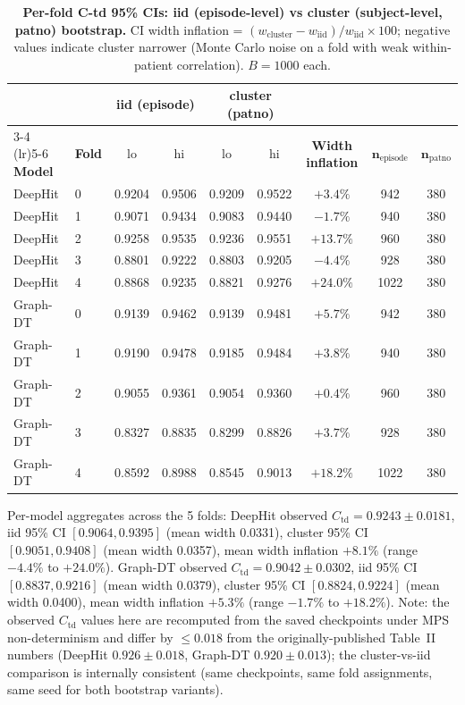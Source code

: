 \documentclass[11pt]{article}
\begin{document}
\begin{table}[h!]
\centering
\caption{\textbf{Per-fold C-td 95\% CIs: iid (episode-level) vs cluster (subject-level, patno) bootstrap.} CI width inflation = $(w_\mathrm{cluster} - w_\mathrm{iid})/w_\mathrm{iid} \times 100$; negative values indicate cluster narrower (Monte Carlo noise on a fold with weak within-patient correlation). $B{=}1000$ each.}
\label{tab:s_wsp32_perfold}
\begin{tabular}{llccccccc}
\toprule
 & & \multicolumn{2}{c}{\textbf{iid (episode)}} & \multicolumn{2}{c}{\textbf{cluster (patno)}} & & & \\
\cmidrule(lr){3-4} \cmidrule(lr){5-6}
\textbf{Model} & \textbf{Fold} & lo & hi & lo & hi & \textbf{Width inflation} & $\mathbf{n_\mathrm{episode}}$ & $\mathbf{n_\mathrm{patno}}$ \\
\midrule
DeepHit  & 0 & 0.9204 & 0.9506 & 0.9209 & 0.9522 & $+3.4\%$  & 942  & 380 \\
DeepHit  & 1 & 0.9071 & 0.9434 & 0.9083 & 0.9440 & $-1.7\%$  & 940  & 380 \\
DeepHit  & 2 & 0.9258 & 0.9535 & 0.9236 & 0.9551 & $+13.7\%$ & 960  & 380 \\
DeepHit  & 3 & 0.8801 & 0.9222 & 0.8803 & 0.9205 & $-4.4\%$  & 928  & 380 \\
DeepHit  & 4 & 0.8868 & 0.9235 & 0.8821 & 0.9276 & $+24.0\%$ & 1022 & 380 \\
\midrule
Graph-DT & 0 & 0.9139 & 0.9462 & 0.9139 & 0.9481 & $+5.7\%$  & 942  & 380 \\
Graph-DT & 1 & 0.9190 & 0.9478 & 0.9185 & 0.9484 & $+3.8\%$  & 940  & 380 \\
Graph-DT & 2 & 0.9055 & 0.9361 & 0.9054 & 0.9360 & $+0.4\%$  & 960  & 380 \\
Graph-DT & 3 & 0.8327 & 0.8835 & 0.8299 & 0.8826 & $+3.7\%$  & 928  & 380 \\
Graph-DT & 4 & 0.8592 & 0.8988 & 0.8545 & 0.9013 & $+18.2\%$ & 1022 & 380 \\
\bottomrule
\end{tabular}
\end{table}

\noindent Per-model aggregates across the 5 folds: DeepHit observed $C_\mathrm{td}{=}0.9243 \pm 0.0181$, iid 95\% CI $[0.9064, 0.9395]$ (mean width 0.0331), cluster 95\% CI $[0.9051, 0.9408]$ (mean width 0.0357), mean width inflation $+8.1\%$ (range $-4.4\%$ to $+24.0\%$). Graph-DT observed $C_\mathrm{td}{=}0.9042 \pm 0.0302$, iid 95\% CI $[0.8837, 0.9216]$ (mean width 0.0379), cluster 95\% CI $[0.8824, 0.9224]$ (mean width 0.0400), mean width inflation $+5.3\%$ (range $-1.7\%$ to $+18.2\%$). Note: the observed $C_\mathrm{td}$ values here are recomputed from the saved checkpoints under MPS non-determinism and differ by $\le 0.018$ from the originally-published Table~II numbers (DeepHit $0.926 \pm 0.018$, Graph-DT $0.920 \pm 0.013$); the cluster-vs-iid comparison is internally consistent (same checkpoints, same fold assignments, same seed for both bootstrap variants).
\end{document}
